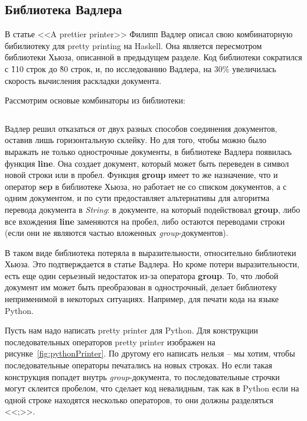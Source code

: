 \newpage

\subsection{Библиотека Вадлера}

В статье <<A prettier printer>>\cite{wadler} Филипп Вадлер описал свою комбинаторную бибилиотеку для pretty printing на Haskell. Она является пересмотром библиотеки Хьюза, описанной в предыдущем разделе. Код библиотеки сократился с \~110 строк до \~80 строк, и, по исследованию Вадлера, на 30\% увеличилась скорость вычисления раскладки документа.

Рассмотрим основые комбинаторы из библиотеки:
\inputminted{haskell}{codes/wadlerBasicOperations.hs}

Вадлер решил отказаться от двух разных способов соединения документов, оставив лишь горизонтальную склейку. Но для того, чтобы можно было выражать не только однострочные документы, в библиотеке Вадлера появилась функция \textbf{line}. Она создает документ, который может быть переведен в символ новой строки или в пробел.
Функция \textbf{group} имеет то же назначение, что и оператор \textbf{sep} в библиотеке Хьюза, но работает не со списком документов, а с одним документом, и по сути предоставляет альтернативы для алгоритма перевода документа в \textit{String}: в документе, на который подействовал \textbf{group}, либо все вхождения \textbf{line} заменяются на пробел, либо остаются переводами строки (если они не являются частью вложенных \textit{group}-документов).

В таком виде библиотека потеряла в выразительности, относительно библиотеки Хьюза. Это подтверждается в статье Вадлера. Но кроме потери выразительности, есть еще один серьезный недостаток из-за оператора \textbf{group}. То, что любой документ им может быть преобразован в однострочный, делает библиотеку неприменимой в некоторых ситуациях. Например, для печати кода на языке Python.

Пусть нам надо написать pretty printer для Python. Для конструкции последовательных операторов pretty printer изображен на рисунке~\ref{fig:pythonPrinter}.
По другому его написать нельзя -- мы хотим, чтобы последовательные операторы печатались на новых строках. Но если такая конструкция попадет внутрь \textit{group}-документа, то последовательные строчки могут склеится пробелом, что сделает код невалидным, так как в Python если на одной строке находятся несколько операторов, то они должны разделяться <<;>>.


